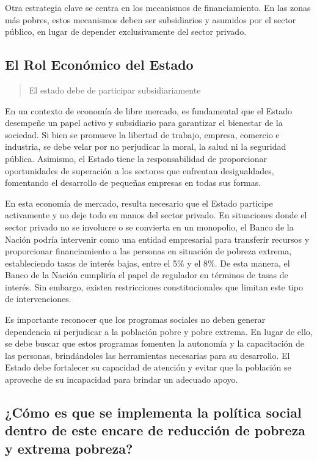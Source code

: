 \documentclass[
  a4paper,
]{article}
\begin{document}
Otra estrategia clave se centra en los mecanismos de financiamiento. En
las zonas más pobres, estos mecanismos deben ser subsidiarios y asumidos
por el sector público, en lugar de depender exclusivamente del sector
privado.

\subsection{El Rol Económico del
Estado}\label{el-rol-econuxf3mico-del-estado}

\begin{quote}
El estado debe de participar subsidiariamente
\end{quote}

En un contexto de economía de libre mercado, es fundamental que el
Estado desempeñe un papel activo y subsidiario para garantizar el
bienestar de la sociedad. Si bien se promueve la libertad de trabajo,
empresa, comercio e industria, se debe velar por no perjudicar la moral,
la salud ni la seguridad pública. Asimismo, el Estado tiene la
responsabilidad de proporcionar oportunidades de superación a los
sectores que enfrentan desigualdades, fomentando el desarrollo de
pequeñas empresas en todas sus formas.

En esta economía de mercado, resulta necesario que el Estado participe
activamente y no deje todo en manos del sector privado. En situaciones
donde el sector privado no se involucre o se convierta en un monopolio,
el Banco de la Nación podría intervenir como una entidad empresarial
para transferir recursos y proporcionar financiamiento a las personas en
situación de pobreza extrema, estableciendo tasas de interés bajas,
entre el 5\% y el 8\%. De esta manera, el Banco de la Nación cumpliría
el papel de regulador en términos de tasas de interés. Sin embargo,
existen restricciones constitucionales que limitan este tipo de
intervenciones.

Es importante reconocer que los programas sociales no deben generar
dependencia ni perjudicar a la población pobre y pobre extrema. En lugar
de ello, se debe buscar que estos programas fomenten la autonomía y la
capacitación de las personas, brindándoles las herramientas necesarias
para su desarrollo. El Estado debe fortalecer su capacidad de atención y
evitar que la población se aproveche de su incapacidad para brindar un
adecuado apoyo.

\subsection{¿Cómo es que se implementa la política social dentro de este
encare de reducción de pobreza y extrema
pobreza?}\label{cuxf3mo-es-que-se-implementa-la-poluxedtica-social-dentro-de-este-encare-de-reducciuxf3n-de-pobreza-y-extrema-pobreza}
\end{document}
